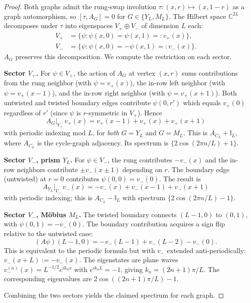 \documentclass[aps,pra,reprint,amsmath,amssymb,superscriptaddress,nofootinbib,longbibliography]{revtex4-2}
\newcommand{\C}{\mathbb{C}}
\newcommand{\I}{\mathbb{I}}
\begin{document}
\begin{proof}
Both graphs admit the rung-swap involution $\tau: (x, r) \mapsto (x, 1-r)$ as a graph automorphism, so $[\tau, A_G] = 0$ for $G \in \{Y_L, M_L\}$. The Hilbert space $\C^{2L}$ decomposes under $\tau$ into eigenspaces $V_+ \oplus V_-$ of dimension $L$ each:
\begin{align}
V_+ &= \{\psi : \psi(x, 0) = \psi(x, 1) =: v_+(x)\}, \\
V_- &= \{\psi : \psi(x, 0) = -\psi(x, 1) =: v_-(x)\}.
\end{align}
$A_G$ preserves this decomposition. We compute the restriction on each sector.

\textbf{Sector $V_+$.} For $\psi \in V_+$, the action of $A_G$ at vertex $(x, r)$ sums contributions from the rung neighbor (with $\psi = v_+(x)$), the in-row left neighbor (with $\psi = v_+(x-1)$), and the in-row right neighbor (with $\psi = v_+(x+1)$). Both untwisted and twisted boundary edges contribute $\psi(0, r')$ which equals $v_+(0)$ regardless of $r'$ (since $\psi$ is $r$-symmetric in $V_+$). Hence
\begin{equation}
A_G\big|_{V_+}\, v_+(x) = v_+(x-1) + v_+(x) + v_+(x+1)
\end{equation}
with periodic indexing mod $L$, for \emph{both} $G = Y_L$ and $G = M_L$. This is $A_{C_L} + \I_L$, where $A_{C_L}$ is the cycle-graph adjacency. Its spectrum is $\{2\cos(2\pi n/L) + 1\}$.

\textbf{Sector $V_-$, prism $Y_L$.} For $\psi \in V_-$, the rung contributes $-v_-(x)$ and the in-row neighbors contribute $\pm v_-(x \pm 1)$ depending on $r$. The boundary edge (untwisted) at $r = 0$ contributes $\psi(0, 0) = v_-(0)$. The result is
\begin{equation}
A_{Y_L}\big|_{V_-}\, v_-(x) = -v_-(x) + v_-(x-1) + v_-(x+1)
\end{equation}
with periodic indexing; this is $A_{C_L} - \I_L$ with spectrum $\{2\cos(2\pi n/L) - 1\}$.

\textbf{Sector $V_-$, M\"obius $M_L$.} The twisted boundary connects $(L-1, 0)$ to $(0, 1)$, with $\psi(0, 1) = -v_-(0)$. The boundary contribution acquires a sign flip relative to the untwisted case:
\begin{equation}
(A\psi)(L-1, 0) = -v_-(L-1) + v_-(L-2) - v_-(0).
\end{equation}
This is equivalent to the periodic formula but with $v_-$ extended anti-periodically: $v_-(x+L) := -v_-(x)$. The eigenstates are plane waves $v_-^{(n)}(x) = L^{-1/2} e^{ik_n x}$ with $e^{i k_n L} = -1$, giving $k_n = (2n+1)\pi/L$. The corresponding eigenvalues are $2\cos((2n+1)\pi/L) - 1$.

Combining the two sectors yields the claimed spectrum for each graph.
\end{proof}
\end{document}
